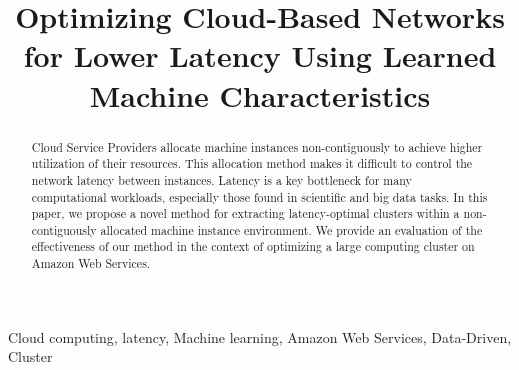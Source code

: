 \documentclass[10pt, conference, compsocconf]{IEEEtran}
\begin{document}
  
\title{Optimizing Cloud-Based Networks for Lower Latency Using Learned Machine Characteristics}
 
\author{
\and
{}
\and
{}
}

\maketitle

\begin{abstract}
Cloud Service Providers allocate machine instances non-contiguously to achieve higher utilization of their resources. This allocation method makes it difficult to control the network latency between instances. Latency is a key bottleneck for many computational workloads, especially those found in scientific and big data tasks. In this paper, we propose a novel method for extracting latency-optimal clusters within a non-contiguously allocated machine instance environment. We provide an evaluation of the effectiveness of our method in the context of optimizing a large computing cluster on Amazon Web Services. 
\end{abstract}

\begin{IEEEkeywords}
Cloud computing, latency, Machine learning, Amazon Web Services, Data-Driven, Cluster
\end{IEEEkeywords}




  
 




\end{document}
